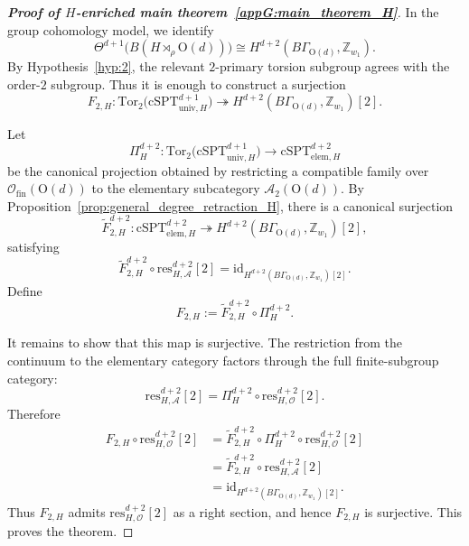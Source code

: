 \documentclass[aps,prx,reprint,superscriptaddress,twocolumn,amsmath,amssymb,amsfonts, nofootinbib]{revtex4-2}
\newcommand{\res}{\text{res}}
\newcommand{\tor}{\text{Tor}}
\theoremstyle{apsstyle}
\begin{document}
\begin{proof}[\textnormal{\textbf{Proof of $H$-enriched main theorem~\ref{appG:main_theorem_H}}}]
In the group cohomology model, we identify
\begin{equation}
\Theta^{d+1}\bigl(B(H\rtimes_{\rho}\mathrm{O}(d))\bigr)
\cong
H^{d+2}(B\Gamma_{\mathrm{O}(d)},\mathbb Z_{w_1}).
\end{equation}
By Hypothesis~\ref{hyp:2}, the relevant $2$-primary torsion subgroup agrees with the order-$2$ subgroup. Thus it is enough to construct a surjection
\begin{equation}
F_{2,H}:
\tor_{2}\bigl( \mathrm{cSPT}^{d+1}_{\mathrm{univ},H} \bigr)
\twoheadrightarrow
H^{d+2}(B\Gamma_{\mathrm{O}(d)},\mathbb Z_{w_1})[2].
\end{equation}

\noindent Let
\begin{equation}
\Pi_{H}^{d+2}:
\tor_{2}\bigl( \mathrm{cSPT}^{d+1}_{\mathrm{univ},H} \bigr)
\longrightarrow
\mathrm{cSPT}_{\mathrm{elem},H}^{d+2}
\end{equation}
be the canonical projection obtained by restricting a compatible family over $\mathcal O_{\mathrm{fin}}(\mathrm{O}(d))$ to the elementary subcategory $\mathcal A_2(\mathrm{O}(d))$. By Proposition~\ref{prop:general_degree_retraction_H}, there is a canonical surjection
\begin{equation}
\widetilde F_{2,H}^{d+2}:
\mathrm{cSPT}_{\mathrm{elem},H}^{d+2}
\twoheadrightarrow
H^{d+2}(B\Gamma_{\mathrm{O}(d)},\mathbb Z_{w_1})[2],
\end{equation}
satisfying
\begin{equation}
\widetilde F_{2,H}^{d+2}\circ \res_{H,\mathcal A}^{d+2}[2]
=
\mathrm{id}_{H^{d+2}(B\Gamma_{\mathrm{O}(d)},\mathbb Z_{w_1})[2]}.
\end{equation}
Define
\begin{equation}
F_{2,H}
:=
\widetilde F_{2,H}^{d+2}\circ \Pi_{H}^{d+2}.
\end{equation}

It remains to show that this map is surjective. The restriction from the continuum to the elementary category factors through the full finite-subgroup category:
\begin{equation}
\res_{H,\mathcal A}^{d+2}[2]
=
\Pi_{H}^{d+2}\circ \res_{H,\mathcal O}^{d+2}[2].
\end{equation}
Therefore
\begin{align}
F_{2,H}\circ \res_{H,\mathcal O}^{d+2}[2]
&=
\widetilde F_{2,H}^{d+2}\circ \Pi_{H}^{d+2}\circ \res_{H,\mathcal O}^{d+2}[2] \\
&=
\widetilde F_{2,H}^{d+2}\circ \res_{H,\mathcal A}^{d+2}[2] \\
&=
\mathrm{id}_{H^{d+2}(B\Gamma_{\mathrm{O}(d)},\mathbb Z_{w_1})[2]}.
\end{align}
Thus $F_{2,H}$ admits $\res_{H,\mathcal O}^{d+2}[2]$ as a right section, and hence $F_{2,H}$ is surjective. This proves the theorem.
\end{proof}
\end{document}

